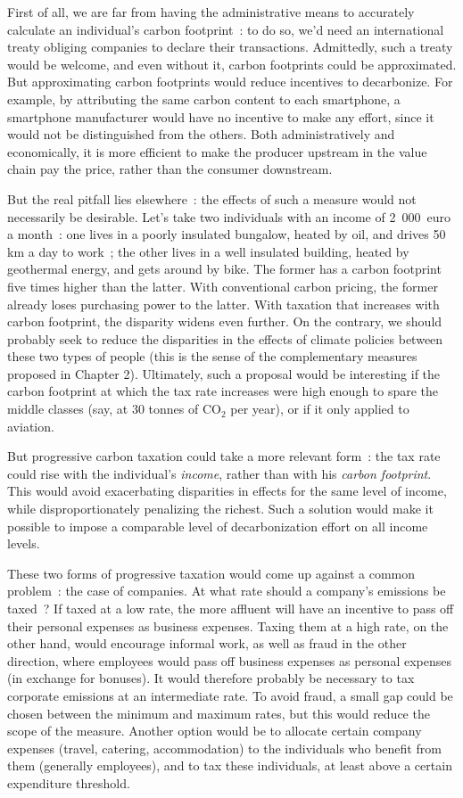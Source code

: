 \documentclass[a5paper,french,openany]{memoir}
\begin{document}
{First of all, we are far from having the administrative means to accurately calculate an individual's carbon footprint~: to do so, we'd need an international treaty obliging companies to declare their transactions. Admittedly, such a treaty would be welcome, and even without it, carbon footprints could be approximated. But approximating carbon footprints would reduce incentives to decarbonize. For example, by attributing the same carbon content to each smartphone, a smartphone manufacturer would have no incentive to make any effort, since it would not be distinguished from the others. Both administratively and economically, it is more efficient to make the producer upstream in the value chain pay the price, rather than the consumer downstream. 

But the real pitfall lies elsewhere~: the effects of such a measure would not necessarily be desirable. Let's take two individuals with an income of 2~000~euro{} a month~: one lives in a poorly insulated bungalow, heated by oil, and drives 50 km a day to work~; the other lives in a well insulated building, heated by geothermal energy, and gets around by bike. The former has a carbon footprint five times higher than the latter. With conventional carbon pricing, the former already loses purchasing power to the latter. With taxation that increases with carbon footprint, the disparity widens even further. On the contrary, we should probably seek to reduce the disparities in the effects of climate policies between these two types of people (this is the sense of the complementary measures proposed in Chapter 2). Ultimately, such a proposal would be interesting if the carbon footprint at which the tax rate increases were high enough to spare the middle classes (say, at 30 tonnes of CO$_\text{2}$ per year), or if it only applied to aviation. %

But progressive carbon taxation could take a more relevant form~: the tax rate could rise with the individual's \textit{income}, rather than with his \textit{carbon footprint}. This would avoid exacerbating disparities in effects for the same level of income, while disproportionately penalizing the richest. Such a solution would make it possible to impose a comparable level of decarbonization effort on all income levels. 

These two forms of progressive taxation would come up against a common problem~: the case of companies. At what rate should a company's emissions be taxed~? If taxed at a low rate, the more affluent will have an incentive to pass off their personal expenses as business expenses. Taxing them at a high rate, on the other hand, would encourage informal work, as well as fraud in the other direction, where employees would pass off business expenses as personal expenses (in exchange for bonuses). It would therefore probably be necessary to tax corporate emissions at an intermediate rate. To avoid fraud, a small gap could be chosen between the minimum and maximum rates, but this would reduce the scope of the measure. Another option would be to allocate certain company expenses (travel, catering, accommodation) to the individuals who benefit from them (generally employees), and to tax these individuals, at least above a certain expenditure threshold. 

}
\end{document}
